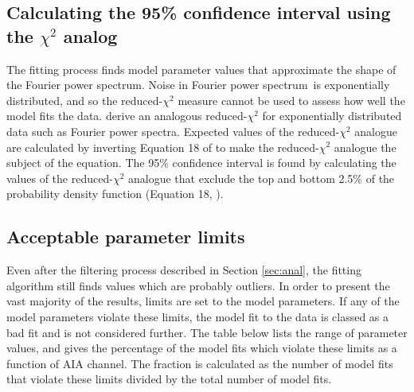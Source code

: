 \documentclass[onecolumn]{emulateapj}
\newcommand{\PS}{power spectrum}
\newcommand{\PA}{power spectra}
\newcommand{\Fps}{Fourier \PS}
\newcommand{\Fpa}{Fourier \PA}
\begin{document}
\subsection{Calculating the 95\% confidence interval using the $\chi^{2}$
analog}\label{sec:app:chi} The fitting process finds model parameter
values that approximate the shape of the \Fps.  Noise in \Fps\ is
exponentially distributed, and so the reduced-$\chi^{2}$ measure
cannot be used to assess how well the model fits the
data. \citet{2014ApJ...789..152N} derive an analogous
reduced-$\chi^{2}$ for exponentially distributed data such as \Fpa.
Expected values of the reduced-$\chi^{2}$ analogue are calculated by
inverting Equation 18 of \citet{2014ApJ...789..152N} to make the
reduced-$\chi^{2}$ analogue the subject of the equation.  The 95\%
confidence interval is found by calculating the values of the
reduced-$\chi^{2}$ analogue that exclude the top and bottom 2.5\% of
the probability density function (Equation 18,
\citet{2014ApJ...789..152N}).

\subsection{Acceptable parameter limits}\label{sec:app:limit}
Even after the filtering process described in Section \ref{sec:anal},
the fitting algorithm still finds values which are probably outliers.
In order to present the vast majority of the results, limits are set
to the model parameters.  If any of the model parameters violate these
limits, the model fit to the data is classed as a bad fit and is not
considered further.  The table below lists the range of parameter
values, and gives the percentage of the model fits which violate these
limits as a function of AIA channel.  The fraction is calculated as
the number of model fits that violate these limits divided by the
total number of model fits.
\end{document}
